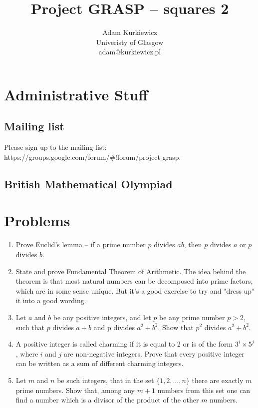 \documentclass{article}
\title{Project GRASP -- squares 2}
\author{Adam Kurkiewicz\\
  \small{Univeristy of Glasgow}\\
  \small{adam@kurkiewicz.pl}}
\begin{document}
  \maketitle
  \section{Administrative Stuff}
  
  \subsection{Mailing list}
  Please sign up to the mailing list: https://groups.google.com/forum/\#!forum/project-grasp.
  \subsection{British Mathematical Olympiad}

  \section{Problems}
  
  \begin{enumerate}
    \item Prove Euclid's lemma -- if a prime number $p$ divides $ab$, then $p$ divides $a$ or $p$ divides $b$.
    \item State and prove Fundamental Theorem of Arithmetic. The idea behind the theorem is that most natural numbers can be decomposed into prime factors, which are in some sense unique. But it's a good exercise to try and "dress up" it into a good wording.
    \item Let $a$ and $b$ be any positive integers, and let $p$ be any prime number $p > 2$, such that $p$ divides $a + b$ and p divides $a^{2} + b^{2}$. Show that $p^{2}$ divides $a^{2} + b^{2}$.
    \item A positive integer is called charming if it is equal to 2 or is of the form $3^{i}×5^{j}$, where $i$ and $j$ are non-negative integers. Prove that every positive integer can be written as a sum of different charming integers.
    \item Let $m$ and $n$ be such integers, that in the set $\{1, 2, \ldots, n\}$ there are exactly $m$ prime numbers. Show that, among any $m + 1$ numbers from this set one can find a number which is a divisor of the product of the other $m$ numbers.
  \end{enumerate}
\end{document}
